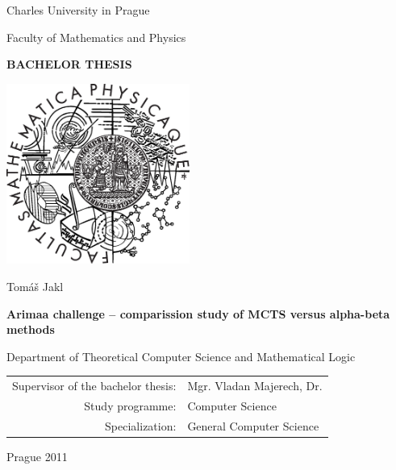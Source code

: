 \documentclass[12pt,a4paper,fleqn]{report}
\begin{document}


\pagestyle{empty}
\begin{center}

\large

Charles University in Prague

\medskip

Faculty of Mathematics and Physics

\vfill

{\bf\Large BACHELOR THESIS}

\vfill

\centerline{\mbox{\includegraphics[width=60mm]{logo.eps}}}

\vfill
\vspace{5mm}

{\LARGE Tomáš Jakl}

\vspace{15mm}

{\LARGE\bfseries Arimaa challenge -- comparission study of MCTS versus alpha-beta methods}

\vfill

Department of Theoretical Computer Science and Mathematical Logic

\vfill

\begin{tabular}{rl}

Supervisor of the bachelor thesis: & Mgr. Vladan Majerech, Dr. \\
\noalign{\vspace{2mm}}
Study programme: & Computer Science \\
\noalign{\vspace{2mm}}
Specialization: & General Computer Science \\
\end{tabular}

\vfill

Prague 2011

\end{center}
\end{document}
